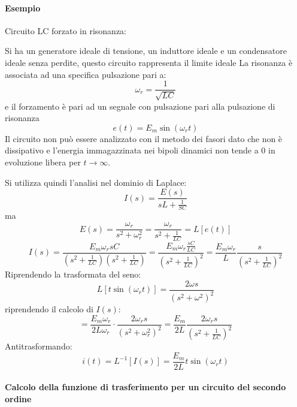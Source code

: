 \paragraph{Esempio} Circuito LC forzato in risonanza:

Si ha un generatore ideale di tensione, un induttore ideale e un condensatore ideale senza perdite,
questo circuito rappresenta il limite ideale 
La risonanza è associata ad una specifica pulsazione pari a:
$$
\omega_r = \frac{1}{\sqrt{LC}}
$$
e il forzamento è pari ad un segnale con pulsazione pari alla pulsazione di risonanza
$$
e(t) = E_m \sin(\omega_r t)
$$
Il circuito non può essere analizzato con il metodo dei fasori dato che non è dissipativo e l'energia 
immagazzinata nei bipoli dinamici non tende a 0 in evoluzione libera per $t\to \infty$.

Si utilizza quindi l'analisi nel dominio di Laplace:
$$
I(s) = \frac{E(s)}{sL+ \frac{1}{SC}}
$$
ma
$$
E(s) = \frac{\omega_r}{s^2+\omega_r^2} = \frac{\omega_r}{s^2+\frac{1}{LC}} = L[e(t)]
$$
$$
I(s) = \frac{E_m\omega_r s C}{(s^2+\frac{1}{LC})(s^2+\frac{1}{LC})} = \frac{E_m\omega_r\frac{sC}{LC}}{(s^2+\frac{1}{LC})^2} = \frac{E_m\omega_r}{L} \frac{s}{(s^2+\frac{1}{LC})^2}
$$
Riprendendo la trasformata del seno:
$$
L[t\sin(\omega_r t)] = \frac{2\omega s}{(s^2+\omega^2)^2}
$$
riprendendo il calcolo di $I(s)$:
$$
= \frac{E_m\omega_r}{2L\omega_r}\cdot \frac{2\omega_r s}{(s^2+\omega_r^2)^2} = \frac{E_m}{2L}\frac{2\omega_r s}{(s^2+\frac{1}{LC})^2}
$$
Antitrasformando:
$$
i(t) = L^{-1}[I(s)] = \frac{E_m}{2L} t \sin(\omega_r t)
$$

\newpage
\paragraph{Calcolo della funzione di trasferimento per un circuito del secondo ordine}


